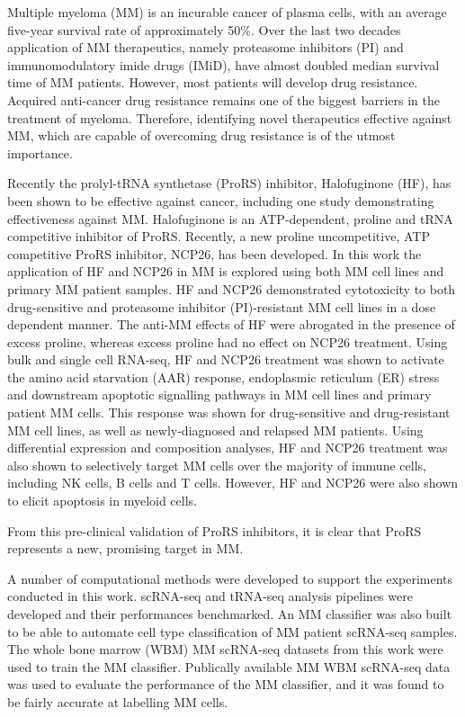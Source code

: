 
Multiple myeloma (MM) is an incurable cancer of plasma cells, with an average five-year survival rate of approximately 50\%.
Over the last two decades application of MM therapeutics, namely proteasome inhibitors (PI) and immunomodulatory imide drugs (IMiD), have almost doubled median survival time of MM patients.
However, most patients will develop drug resistance.
Acquired anti-cancer drug resistance remains one of the biggest barriers in the treatment of myeloma.
Therefore, identifying novel therapeutics effective against MM, which are capable of overcoming drug resistance is of the utmost importance.

Recently the prolyl-tRNA synthetase (ProRS) inhibitor, Halofuginone (HF), has been shown to be effective against cancer, including one study demonstrating effectiveness against MM\@.
Halofuginone is an ATP-dependent, proline and tRNA competitive inhibitor of ProRS\@.
Recently, a new proline uncompetitive, ATP competitive ProRS inhibitor, NCP26, has been developed.
In this work the application of HF and NCP26 in MM is explored using both MM cell lines and primary MM patient samples.
HF and NCP26 demonstrated cytotoxicity to both drug-sensitive and proteasome inhibitor (PI)-resistant MM cell lines in a dose dependent manner.
The anti-MM effects of HF were abrogated in the presence of excess proline, whereas excess proline had no effect on NCP26 treatment.
Using bulk and single cell RNA-seq, HF and NCP26 treatment was shown to activate the amino acid starvation (AAR) response, endoplasmic reticulum (ER) stress and downstream apoptotic signalling pathways in MM cell lines and primary patient MM cells.
This response was shown for drug-sensitive and drug-resistant MM cell lines, as well as newly-diagnosed and relapsed MM patients.
Using differential expression and composition analyses, HF and NCP26 treatment was also shown to selectively target MM cells over the majority of immune cells, including NK cells, B cells and T cells.
However, HF and NCP26 were also shown to elicit apoptosis in myeloid cells.

From this pre-clinical validation of ProRS inhibitors, it is clear that ProRS represents a new, promising target in MM\@.

A number of computational methods were developed to support the experiments conducted in this work.
scRNA-seq and tRNA-seq analysis pipelines were developed and their performances benchmarked.
An MM classifier was also built to be able to automate cell type classification of MM patient scRNA-seq samples.
The whole bone marrow (WBM) MM scRNA-seq datasets from this work were used to train the MM classifier.
Publically available MM WBM scRNA-seq data was used to evaluate the performance of the MM classifier, and it was found to be fairly accurate at labelling MM cells.


